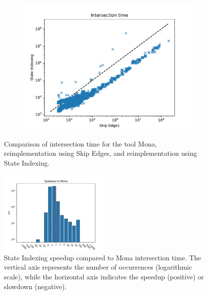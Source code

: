 \documentclass[pdflatex,sn-mathphys-num]{sn-jnl}%
\theoremstyle{thmstyleone}%
\theoremstyle{thmstyletwo}%
\theoremstyle{thmstylethree}%
\begin{document}
\begin{figure}[h!]
\begin{subfigure}{0.49\textwidth}
                    \includegraphics[width=\textwidth]{Figures/intersection-mata.pdf}
                \end{subfigure}
                \caption{Comparison of intersection time for the tool Mona, reimplementation using Skip Edges, and reimplementation using State Indexing.}
                \label{fig:intersection_log}
            \end{figure}
            \vspace*{-3em}
            \begin{figure}[h!]
                \centering
                \includegraphics[width=0.49\textwidth]{Figures/intersection-speedup.pdf}
                \caption{State Indexing speedup compared to Mona intersection time. The vertical axis represents the number of occurrences (logarithmic scale), while the horizontal axis indicates the speedup (positive) or slowdown (negative).}
                \label{fig:intersection_speedup}
            \end{figure}
\end{document}

